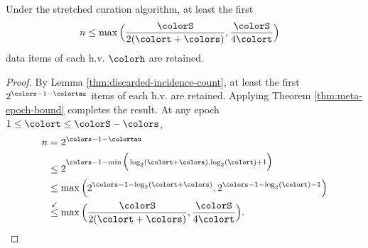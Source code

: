 \begin{corollary}
\label{thm:stretched-reservation-count}
Under the stretched curation algorithm, at least the first
\begin{align*}
n &\leq
\max\Big(
  \frac{\colorS}{2(\colort + \colors)},
  \frac{\colorS}{4\colort}
\Big)
\end{align*}
data items of each h.v. $\colorh$ are retained.
\end{corollary}
\begin{proof}

By Lemma \ref{thm:discarded-incidence-count}, at least the first $2^{\colors - 1 - \colortau}$ items of each h.v. are retained.
Applying Theorem \ref{thm:meta-epoch-bound} completes the result.
At any epoch $1 \leq \colort \leq \colorS - \colors$,
\begin{align*}
n
&= 2^{\colors - 1 - \colortau}\\
&\leq2^{\colors - 1 - \min\Big(
  \log_2(\colort + \colors),
  \log_2(\colort) + 1
\Big)}\\
&\leq \max\Big(
  2^{\colors - 1 - \log_2(\colort + \colors)},
  2^{\colors - 1 - \log_2(\colort) - 1}
\Big)\\
&\stackrel{\checkmark}{\leq} \max\Big(
  \frac{\colorS}{2(\colort + \colors)},
  \frac{\colorS}{4\colort}
\Big).
\end{align*}

\end{proof}

